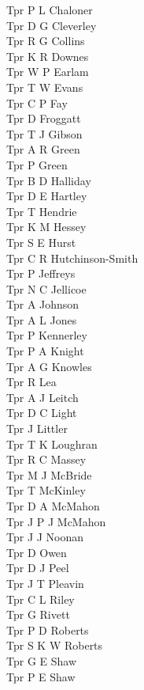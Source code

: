 \begin{multicols}{2}
  Tpr P L Chaloner \\
  Tpr D G Cleverley \\
  Tpr R G Collins \\
  Tpr K R Downes \\
  Tpr W P Earlam \\
  Tpr T W Evans \\
  Tpr C P Fay \\
  Tpr D Froggatt \\
  Tpr T J Gibson \\
  Tpr A R Green \\
  Tpr P Green \\
  Tpr B D Halliday \\
  Tpr D E Hartley \\
  Tpr T Hendrie \\
  Tpr K M Hessey \\
  Tpr S E Hurst \\
  Tpr C R Hutchinson-Smith \\
  Tpr P Jeffreys \\
  Tpr N C Jellicoe \\
  Tpr A Johnson \\
  Tpr A L Jones \\
  Tpr P Kennerley \\
  Tpr P A Knight \\
  Tpr A G Knowles \\
  Tpr R Lea \\
  Tpr A J Leitch \\
  Tpr D C Light \\
  Tpr J Littler \\
  Tpr T K Loughran \\
  Tpr R C Massey \\
  Tpr M J McBride \\
  Tpr T McKinley \\
  Tpr D A McMahon \\
  Tpr J P J McMahon \\
  Tpr J J Noonan \\
  Tpr D Owen \\
  Tpr D J Peel \\
  Tpr J T Pleavin \\
  Tpr C L Riley \\
  Tpr G Rivett \\
  Tpr P D Roberts \\
  Tpr S K W Roberts \\
  Tpr G E Shaw \\
  Tpr P E Shaw \\

\end{multicols}
